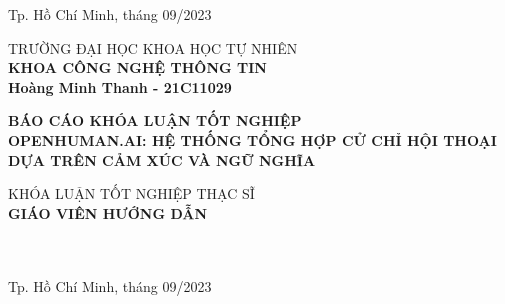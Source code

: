 \begin{titlepage}
\begin{center}
\vfill
Tp. Hồ Chí Minh, tháng 09/2023

\end{center}

\pagebreak



\begin{center}

TRƯỜNG ĐẠI HỌC KHOA HỌC TỰ NHIÊN\\
\textbf{KHOA CÔNG NGHỆ THÔNG TIN}\\[2cm]


{\large \bfseries Hoàng Minh Thanh - 21C11029\\[2cm]}


{ \Large \bfseries  BÁO CÁO KHÓA LUẬN TỐT NGHIỆP \\OPENHUMAN.AI: HỆ THỐNG TỔNG HỢP CỬ CHỈ HỘI THOẠI DỰA TRÊN CẢM XÚC VÀ NGỮ NGHĨA\\[2cm] } 


\large KHÓA LUẬN TỐT NGHIỆP THẠC SĨ \\


\textbf{GIÁO VIÊN HƯỚNG DẪN}\\
\tenGVHD\\
\tenBM\\


\vfill
Tp. Hồ Chí Minh, tháng 09/2023

\end{center}

\end{titlepage}